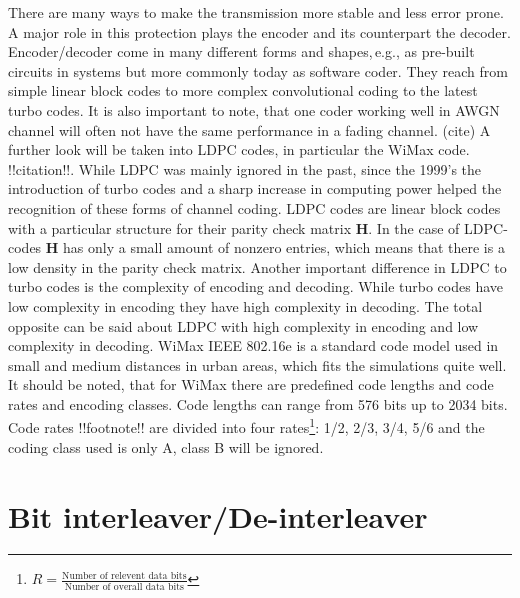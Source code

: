 There are many ways to make the transmission more stable and less error prone. A major role in this protection plays the encoder and its counterpart the decoder. Encoder/decoder come in many different forms and shapes,\,e.g., as pre-built circuits in systems but more commonly today as software coder. They reach from simple linear block codes to more complex convolutional coding to the latest turbo codes. It is also important to note, that one coder working well in \gls{AWGN} channel will often not have the same performance in a fading channel. (cite)
\newline
A further look will be taken into \gls{LDPC} codes, in particular the WiMax code. !!citation!!. While \gls{LDPC} was mainly ignored in the past, since the 1999's the introduction of turbo codes and a sharp increase in computing power helped the recognition of these forms of channel coding.
\newline
\gls{LDPC} codes are linear block codes with a particular structure for their parity check matrix \textbf{H}. In the case of \gls{LDPC}-codes \textbf{H} has only a small amount of nonzero entries, which means that there is a low density in the parity check matrix.
Another important difference in LDPC to turbo codes is the complexity of encoding and decoding. While turbo codes have low complexity in encoding they have high complexity in decoding. The total opposite can be said about \gls{LDPC} with high complexity in encoding and low complexity in decoding.  
\newline
WiMax IEEE 802.16e is a standard code model used in small and medium distances in urban areas, which fits the simulations quite well. It should be noted, that for WiMax there are predefined code lengths and code rates and encoding classes. Code lengths can range from 576 bits up to 2034 bits. Code rates !!footnote!! are divided into four rates\footnote{$R = \frac{\textrm{Number of relevent data bits}}{\textrm{Number of overall data bits}} $}: 1/2, 2/3, 3/4, 5/6 and the coding class used is only A, class B will be ignored.
\newpage

\section{Bit interleaver/De-interleaver}
\label{sec:interleaver}

